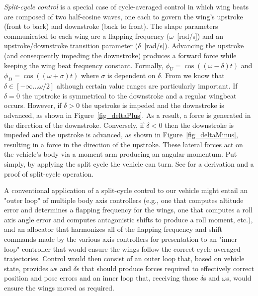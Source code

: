 \textit{Split-cycle control} is a special case of cycle-averaged control in which wing beats are composed of two half-cosine waves, one each to govern the wing's upstroke (front to back) and downstroke (back to front). The shape parameters communicated to each wing are a flapping frequency ($\omega$~[rad/s]) and an upstroke/downstroke transition parameter ($\delta$~[rad/s]). Advancing the upstroke (and consequently impeding the downstroke) produces a forward force while keeping the wing beat frequency constant. Formally, $\phi_U = \cos( (\omega - \delta)t)$  and $\phi_D = \cos( (\omega + \sigma )t)$ where $\sigma$ is dependent on $\delta$. From \cite{afrl2} we know that $\delta \in [-\infty \ldots\omega /2]$ although certain value ranges are particularly important. If $\delta = 0$ the upstroke is symmetrical to the downstroke and a regular wingbeat occurs. However, if $\delta>0$ the upstroke is impeded and the downstroke is advanced, as shown in Figure~\ref{fig_deltaPlus}. As a result, a force is generated in the direction of the downstroke. Conversely, if $\delta<0$ then the downstroke is impeded and the upstroke is advanced, as shown in Figure~\ref{fig_deltaMinus}, resulting in a force in the direction of the upstroke. These lateral forces act on the vehicle's body via a moment arm producing an angular momentum. Put simply, by applying the split cycle the vehicle can turn. See \cite{afrl2} for a derivation and a proof of split-cycle operation.

A conventional application of a split-cycle control to our vehicle might entail an "outer loop" of multiple body axis controllers (e.g., one that computes altitude error and determines a flapping frequency for the wings, one that computes a roll axis angle error and computes antagonistic shifts to produce a roll moment, etc.), and an allocator that harmonizes all of the flapping frequency and shift commands made by the various axis controllers for presentation to an "inner loop" controller that would ensure the wings follow the correct cycle averaged trajectories. Control would then consist of an outer loop that, based on vehicle state, provides $\omega$s and $\delta$s that should produce forces required to effectively correct position and pose errors and an inner loop that, receiving those $\delta$s and $\omega$s, would ensure the wings moved as required.


